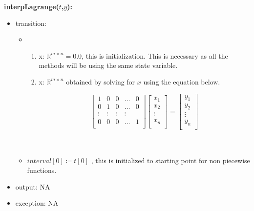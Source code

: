 \documentclass[12pt, titlepage]{article}
\begin{document}
\noindent \textbf{interpLagrange($t$,$y$):}
\begin{itemize}
	\item transition:
	\begin{itemize}
		\item 
		\begin{enumerate}
			\item x: $\mathbb{R}^{m \times n} = 0.0 $, this is initialization. 
			This is necessary as all the methods will be using the same state 
			variable.
			
			\item x: $\mathbb{R}^{m \times n}$ obtained by solving for $x$ 
			using 
			the equation below.
			
			\begin{equation*}
			\begin{bmatrix}
			1 & 0 & 0 & \dots & 0 \\
			0 & 1 & 0 & \dots & 0 \\
			\vdots & \vdots & \vdots & \vdots \\
			0 & 0 & 0 & \dots & 1 \\
			\end{bmatrix}
			\begin{bmatrix}
			x_1  \\
			x_2 \\
			\vdots \\
			x_n \\
			\end{bmatrix} = 
			\begin{bmatrix}
			y_1  \\
			y_2 \\
			\vdots \\
			y_n \\
			\end{bmatrix}
			\end{equation*}\\ \\ 
		\end{enumerate}
		\item $interval[0] \coloneqq t[0] $ , this is initialized to 
		starting point for non piecewise functions.
	\end{itemize}	
	\item output: NA 
	
	\item exception: NA
\end{itemize}
\end{document}
